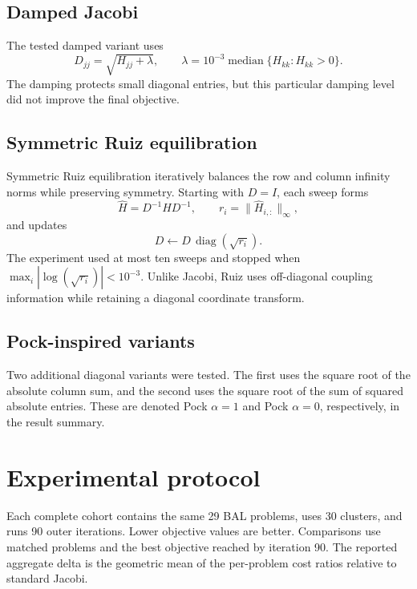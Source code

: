 \documentclass[11pt]{article}
\begin{document}
\subsection{Damped Jacobi}

The tested damped variant uses
\begin{equation}
  D_{jj} = \sqrt{H_{jj} + \lambda},
  \qquad
  \lambda = 10^{-3}\operatorname{median}\{H_{kk}:H_{kk}>0\}.
\end{equation}
The damping protects small diagonal entries, but this particular damping level
did not improve the final objective.

\subsection{Symmetric Ruiz equilibration}

Symmetric Ruiz equilibration iteratively balances the row and column infinity
norms while preserving symmetry.  Starting with $D=I$, each sweep forms
\begin{equation}
  \widehat H = D^{-1}HD^{-1},
  \qquad
  r_i = \lVert \widehat H_{i,:}\rVert_\infty,
\end{equation}
and updates
\begin{equation}
  D \leftarrow D\,\operatorname{diag}(\sqrt{r_i}).
\end{equation}
The experiment used at most ten sweeps and stopped when
$\max_i|\log(\sqrt{r_i})|<10^{-3}$.  Unlike Jacobi, Ruiz uses off-diagonal
coupling information while retaining a diagonal coordinate transform.

\subsection{Pock-inspired variants}

Two additional diagonal variants were tested.  The first uses the square root
of the absolute column sum, and the second uses the square root of the sum of
squared absolute entries.  These are denoted Pock $\alpha=1$ and Pock
$\alpha=0$, respectively, in the result summary.

\section{Experimental protocol}

Each complete cohort contains the same 29 BAL problems, uses 30 clusters, and
runs 90 outer iterations.  Lower objective values are better.  Comparisons use
matched problems and the best objective reached by iteration 90.  The reported
aggregate delta is the geometric mean of the per-problem cost ratios relative
to standard Jacobi.
\end{document}
